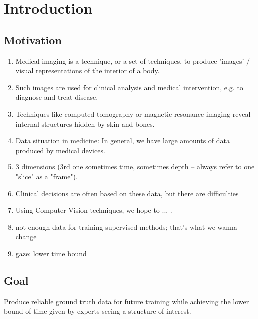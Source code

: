 \chapter{Introduction}
\label{chap:introduction}

\section{Motivation}
    \begin{enumerate}
      \item Medical imaging is a technique, or a set of techniques, to produce 'images' / visual representations of the interior of a body. 
      \item Such images are used for clinical analysis and medical intervention, e.g. to diagnose and treat disease. 
      \item Techniques like computed tomography or magnetic resonance imaging reveal internal structures hidden by skin and bones. 
      \item Data situation in medicine: In general, we have large amounts of data produced by medical devices.
      \item 3 dimensions (3rd one sometimes time, sometimes depth – always refer to one "slice" as a "frame").
      \item Clinical decisions are often based on these data, but there are difficulties
      \item Using Computer Vision techniques, we hope to ... .
      \item not enough data for training supervised methods; that's what we wanna change
      \item gaze: lower time bound
    \end{enumerate}
  
  
\section{Goal}
Produce reliable ground truth data for future training while achieving the lower bound of time given by experts seeing a structure of interest.